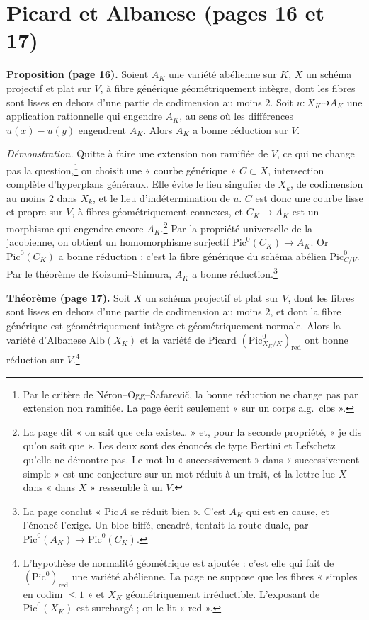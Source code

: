 \documentclass[11pt,a4paper]{article}
\begin{document}
\section*{Picard et Albanese (pages 16 et 17)}

\textbf{Proposition (page 16).} Soient $A_K$ une variété abélienne sur $K$, $X$
un schéma projectif et plat sur $V$, à fibre générique géométriquement
intègre, dont les fibres sont lisses en dehors d'une partie de codimension au
moins $2$. Soit $u \colon X_K \dashrightarrow A_K$ une application rationnelle
qui engendre $A_K$, au sens où les différences $u(x) - u(y)$ engendrent $A_K$.
Alors $A_K$ a bonne réduction sur $V$.

\emph{Démonstration.} Quitte à faire une extension non ramifiée de $V$, ce qui
ne change pas la question,\footnote{Par le critère de Néron--Ogg--Šafarevič, la
bonne réduction ne change pas par extension non ramifiée. La page écrit
seulement « sur un corps alg.\ clos ».} on choisit une « courbe générique »
$C \subset X$, intersection complète d'hyperplans généraux. Elle évite le lieu
singulier de $X_k$, de codimension au moins $2$ dans $X_k$, et le lieu
d'indétermination de $u$. $C$ est donc une courbe lisse et propre sur $V$, à
fibres géométriquement connexes, et $C_K \to A_K$ est un morphisme qui engendre
encore $A_K$.\footnote{La page dit « on sait que cela existe… » et, pour la
seconde propriété, « je dis qu'on sait que ». Les deux sont des énoncés de
type Bertini et Lefschetz qu'elle ne démontre pas. Le mot lu « successivement »
dans « successivement simple » est une conjecture sur un mot réduit à un
trait, et la lettre lue $X$ dans « dans $X$ » ressemble à un $V$.} Par la
propriété universelle de la jacobienne, on obtient un homomorphisme surjectif
$\mathrm{Pic}^{0}(C_K) \to A_K$. Or $\mathrm{Pic}^{0}(C_K)$ a bonne réduction :
c'est la fibre générique du schéma abélien $\mathrm{Pic}^{0}_{C/V}$. Par le
théorème de Koizumi--Shimura, $A_K$ a bonne réduction.\footnote{La page conclut
« $\mathrm{Pic}\, A$ se réduit bien ». C'est $A_K$ qui est en cause, et
l'énoncé l'exige. Un bloc biffé, encadré, tentait la route duale, par
$\mathrm{Pic}^{0}(A_K) \to \mathrm{Pic}^{0}(C_K)$.}

\textbf{Théorème (page 17).} Soit $X$ un schéma projectif et plat sur $V$, dont
les fibres sont lisses en dehors d'une partie de codimension au moins $2$, et
dont la fibre générique est géométriquement intègre et géométriquement
normale. Alors la variété d'Albanese $\mathrm{Alb}(X_K)$ et la variété de
Picard $(\mathrm{Pic}^{0}_{X_K/K})_{\mathrm{red}}$ ont bonne réduction sur
$V$.\footnote{L'hypothèse de normalité géométrique est ajoutée : c'est elle qui
fait de $(\mathrm{Pic}^{0})_{\mathrm{red}}$ une variété abélienne. La page ne
suppose que les fibres « simples en codim $\leq 1$ » et $X_K$ géométriquement
irréductible. L'exposant de $\mathrm{Pic}^{0}(X_K)$ est surchargé ; on le lit
« red ».}
\end{document}
